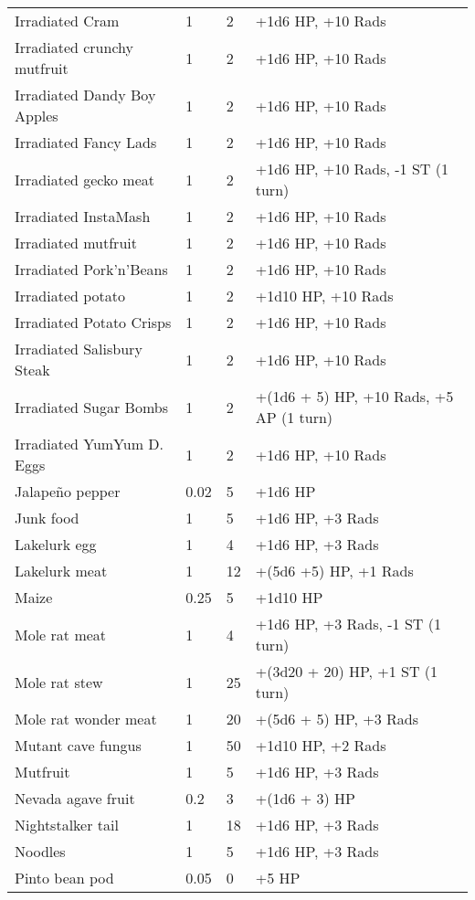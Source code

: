 \begin{longtable}{|p{4cm}|p{1.5cm}|p{1.5cm}|p{9cm}|}
Irradiated Cram & 1 & 2 & +1d6 HP, +10 Rads \\
Irradiated crunchy mutfruit & 1 & 2 & +1d6 HP, +10 Rads \\
Irradiated Dandy Boy Apples & 1 & 2 & +1d6 HP, +10 Rads \\
Irradiated Fancy Lads & 1 & 2 & +1d6 HP, +10 Rads \\
Irradiated gecko meat & 1 & 2 & +1d6 HP, +10 Rads, -1 ST (1 turn) \\
Irradiated InstaMash & 1 & 2 & +1d6 HP, +10 Rads \\
Irradiated mutfruit & 1 & 2 & +1d6 HP, +10 Rads \\
Irradiated Pork'n'Beans & 1 & 2 & +1d6 HP, +10 Rads \\
Irradiated potato & 1 & 2 & +1d10 HP, +10 Rads \\
Irradiated Potato Crisps & 1 & 2 & +1d6 HP, +10 Rads \\
Irradiated Salisbury Steak & 1 & 2 & +1d6 HP, +10 Rads \\
Irradiated Sugar Bombs & 1 & 2 & +(1d6 + 5) HP, +10 Rads, +5 AP (1 turn) \\
Irradiated YumYum D. Eggs & 1 & 2 & +1d6 HP, +10 Rads \\
Jalapeño pepper & 0.02 & 5 & +1d6 HP \\
Junk food & 1 & 5 & +1d6 HP, +3 Rads \\
Lakelurk egg & 1 & 4 & +1d6 HP, +3 Rads \\
Lakelurk meat & 1 & 12 & +(5d6 +5) HP, +1 Rads \\
Maize & 0.25 & 5 & +1d10 HP \\
Mole rat meat & 1 & 4 & +1d6 HP, +3 Rads, -1 ST (1 turn) \\
Mole rat stew & 1 & 25 & +(3d20 + 20) HP, +1 ST (1 turn) \\
Mole rat wonder meat & 1 & 20 & +(5d6 + 5) HP, +3 Rads \\
Mutant cave fungus & 1 & 50 & +1d10 HP, +2 Rads \\
Mutfruit & 1 & 5 & +1d6 HP, +3 Rads \\
Nevada agave fruit & 0.2 & 3 & +(1d6 + 3) HP \\
Nightstalker tail & 1 & 18 & +1d6 HP, +3 Rads \\
Noodles & 1 & 5 & +1d6 HP, +3 Rads \\
Pinto bean pod & 0.05 & 0 & +5 HP \\

\end{longtable}
